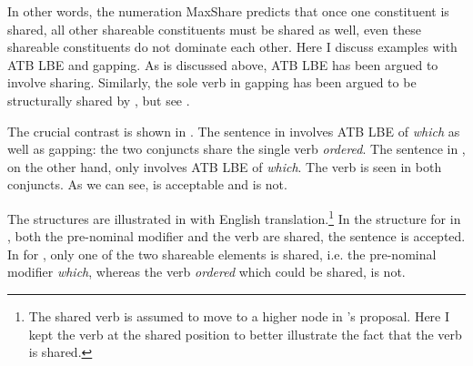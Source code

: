 \documentclass[output=paper]{langscibook}
\begin{document}

In other words, the numeration MaxShare predicts that once one constituent is shared, all other shareable constituents must be shared as well, even these shareable constituents do not dominate each other. Here I discuss examples with ATB LBE and gapping.
As is discussed above, ATB LBE has been argued to involve sharing. 
Similarly, the sole verb in gapping has been argued to be structurally shared by \citet{Citko:2011}, 
but see \citet{Citko:2018}.

 
The crucial contrast is shown in .  
The sentence in  involves ATB LBE of \textit{which} as well as gapping: the two conjuncts share the single verb \textit{ordered}. 
The sentence in , on the other hand, only involves ATB LBE of \textit{which}. The verb is seen in both conjuncts.
As we can see,  is acceptable and  is not. 

\ea 
	\label{shengapAtb}
	\z 
\z 

The structures are illustrated in  with English translation.\footnote{The shared verb is assumed to move to a higher node in \citet{Citko:2011}'s proposal. 
Here I kept the verb at the shared position to better illustrate the fact that the verb is shared.}
In the structure for  in , both the pre-nominal modifier and the verb are shared, the sentence is accepted. 
In  for , only one of the two shareable elements is shared, i.e.  the pre-nominal modifier \textit{which}, whereas the verb \textit{ordered} which could be shared, is not.
\end{document}
